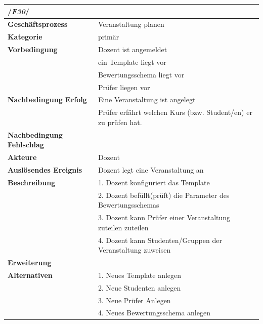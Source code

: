 		
			\begin{table}[H]
			\begin{tabular}{ll}
				\multicolumn{2}{l}{/\textbf{\textit{F30}}/}\\\hline
				 \textbf{Geschäftsprozess} & Veranstaltung planen \\ 
				 \textbf{Kategorie} & primär \\ 
				 \textbf{Vorbedingung} & Dozent ist angemeldet\\
				 & ein Template liegt vor \\ 
				  	& Bewertungsschema liegt vor\\
				 	& Prüfer liegen vor\\
				 \textbf{Nachbedingung Erfolg} & Eine Veranstaltung ist angelegt  \\ 
				 & Prüfer erfährt welchen Kurs (bzw.  Student/en) er zu prüfen hat.\\
				 \textbf{Nachbedingung Fehlschlag} &  \\ 
				 \textbf{Akteure} & Dozent \\ 
				 \textbf{Auslösendes Ereignis} & Dozent legt eine Veranstaltung an  \\ 
				 \textbf{Beschreibung} &  1. Dozent konfiguriert das Template\\ 
				 & 2. Dozent befüllt(prüft) die Parameter des Bewertungsschemas\\
				 & 3. Dozent kann Prüfer einer Veranstaltung zuteilen zuteilen \\
				 & 4. Dozent kann Studenten/Gruppen der  Veranstaltung zuweisen\\
				  \textbf{Erweiterung} &  \\ 
				 \textbf{Alternativen} & 1. Neues Template anlegen \\
				 & 2. Neue Studenten anlegen\\
				 & 3. Neue Prüfer Anlegen \\
				 & 4. Neues Bewertungsschema anlegen
				 \end{tabular} 
			\label{tab:F30}
			\end{table}
	
